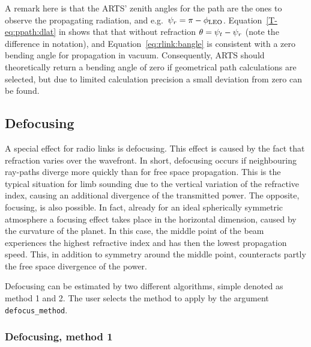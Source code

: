 A remark here is that the ARTS' zenith angles for the path are the ones to
observe the propagating radiation, and e.g.\
$\psi_{r}=\pi-\phi_{\mathrm{LEO}}$. Equation~\ref{T-eq:ppath:dlat} in
\theory shows that that without refraction $\theta=\psi_{t} - \psi_{r}$
(note the difference in notation), and Equation~\ref{eq:rlink:bangle} is
consistent with a zero bending angle for propagation in vacuum. Consequently,
ARTS should theoretically return a bending angle of zero if geometrical path
calculations are selected, but due to limited calculation precision a small
deviation from zero can be found.




\subsection{Defocusing}
\label{sec:rlink:defoc}
%
A special effect for radio links is defocusing. This effect is caused by the
fact that refraction varies over the wavefront. In short, defocusing occurs if
neighbouring ray-paths diverge more quickly than for free space propagation.
This is the typical situation for limb sounding due to the vertical variation
of the refractive index, causing an additional divergence of the transmitted
power. The opposite, focusing, is also possible. In fact, already for an ideal
spherically symmetric atmosphere a focusing effect takes place in the
horizontal dimension, caused by the curvature of the planet. In this case, the
middle point of the beam experiences the highest refractive index and has then
the lowest propagation speed. This, in addition to symmetry around the middle
point, counteracts partly the free space divergence of the power.

Defocusing can be estimated by two different algorithms, simple denoted as
method 1 and 2. The user selects the method to apply by the argument
\texttt{defocus\_method}.

\subsubsection{Defocusing, method 1}
\label{sec:rlink:defocm1}

